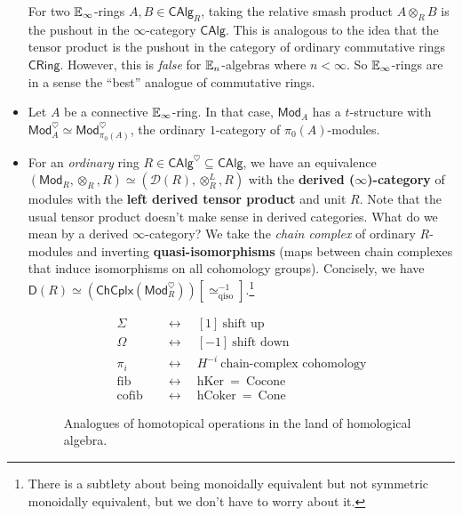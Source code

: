 \begin{example}
\begin{itemize}
    For two $\mathbb{E}_{\infty}$-rings $A,B \in \mathsf{CAlg}_R $, taking the relative smash product $A\otimes _R B$ is the pushout in the $\infty$-category $\mathsf{CAlg} $. This is analogous to the idea that the tensor product is the pushout in the category of ordinary commutative rings $\mathsf{CRing} $. However, this is \emph{false} for $\mathbb{E}_n $-algebras where $n< \infty$. So $\mathbb{E}_{\infty}$-rings are in a sense the ``best'' analogue of commutative rings.

\item Let $A$ be a connective $\mathbb{E}_{\infty}$-ring. In that case, $\mathsf{Mod} _A$ has a $t$-structure with $\mathsf{Mod} _A^{\heartsuit} \simeq  \mathsf{Mod} _{\pi_0(A)}^{\heartsuit}$, the ordinary $1$-category of $\pi_0(A)$-modules.

\item For an \emph{ordinary} ring $R \in \mathsf{CAlg} ^{\heartsuit}\subseteq \mathsf{CAlg} $, we have an equivalence $(\mathsf{Mod} _R, \otimes_R, R)\simeq (\mathcal{D} (R), \otimes_R^L, R)$ with the \textbf{derived ($\infty$)-category} of modules with the \textbf{left derived tensor product} and unit $R$. Note that the usual tensor product doesn't make sense in derived categories. What do we mean by a derived $\infty$-category? We take the \emph{chain complex} of ordinary $R$-modules and inverting \textbf{quasi-isomorphisms} (maps between chain complexes that induce isomorphisms on all cohomology groups). Concisely, we have $\mathsf{D} (R) \simeq (\mathsf{ChCplx} (\mathsf{Mod} _R^{\heartsuit}))[ \simeq  ^{-1} _{\text{qiso}} ] $.\footnote{There is a subtlety about being monoidally equivalent but not symmetric monoidally equivalent, but we don't have to worry about it.}

    \begin{figure}[H]
        \begin{align*}
            \Sigma\quad & \longleftrightarrow \quad [1] \ \text{shift up}  \\
            \Omega\quad& \longleftrightarrow \quad [-1]\ \text{shift down}   \\
           \pi_i \quad& \longleftrightarrow \quad H ^{-i} \ \text{chain-complex cohomology}  \\ 
           \mathrm{fib}\quad& \longleftrightarrow\quad \mathrm{hKer}\ = \ \text{Cocone} \\
           \mathrm{cofib}\quad& \longleftrightarrow \quad \mathrm{hCoker}\ = \ \text{Cone} 
        \end{align*}
        \caption{Analogues of homotopical operations in the land of homological algebra.} 
        \label{hvsh} 
\end{figure}


\end{itemize}
\end{example}
